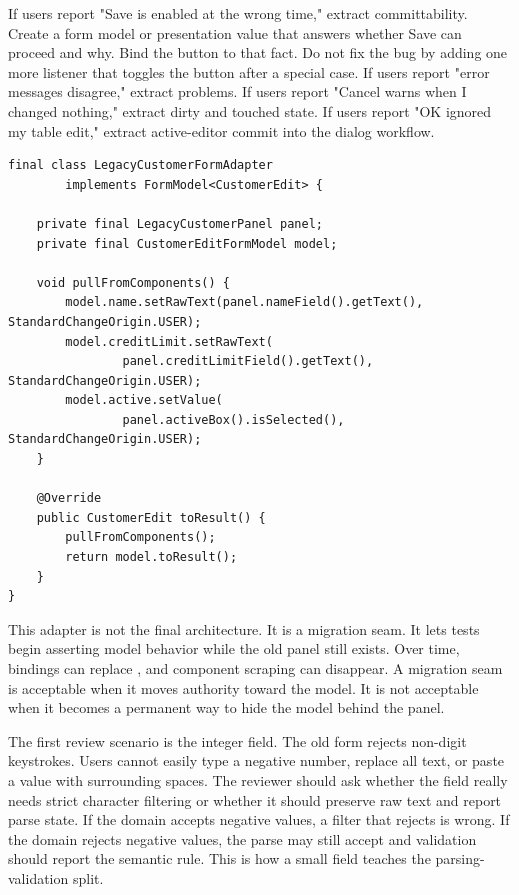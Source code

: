 If users report "Save is enabled at the wrong time," extract committability.
Create a form model or presentation value that answers whether Save can
proceed and why. Bind the button to that fact. Do not fix the bug by adding one
more listener that toggles the button after a special case. If users report
"error messages disagree," extract problems. If users report "Cancel warns
when I changed nothing," extract dirty and touched state. If users report "OK
ignored my table edit," extract active-editor commit into the dialog workflow.

\begin{lstlisting}[caption={A migration seam around legacy component state.}]
final class LegacyCustomerFormAdapter
        implements FormModel<CustomerEdit> {

    private final LegacyCustomerPanel panel;
    private final CustomerEditFormModel model;

    void pullFromComponents() {
        model.name.setRawText(panel.nameField().getText(), StandardChangeOrigin.USER);
        model.creditLimit.setRawText(
                panel.creditLimitField().getText(), StandardChangeOrigin.USER);
        model.active.setValue(
                panel.activeBox().isSelected(), StandardChangeOrigin.USER);
    }

    @Override
    public CustomerEdit toResult() {
        pullFromComponents();
        return model.toResult();
    }
}
\end{lstlisting}

This adapter is not the final architecture. It is a migration seam. It lets
tests begin asserting model behavior while the old panel still exists. Over
time, bindings can replace , and component scraping can
disappear. A migration seam is acceptable when it moves authority toward the
model. It is not acceptable when it becomes a permanent way to hide the model
behind the panel.

The first review scenario is the integer field. The old form rejects non-digit
keystrokes. Users cannot easily type a negative number, replace all text, or
paste a value with surrounding spaces. The reviewer should ask whether the
field really needs strict character filtering or whether it should preserve raw
text and report parse state. If the domain accepts negative values, a filter
that rejects \api{-} is wrong. If the domain rejects negative values, the parse
may still accept  and validation should report the semantic rule. This
is how a small field teaches the parsing-validation split.


